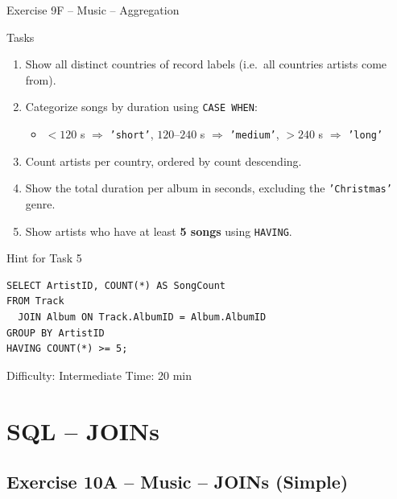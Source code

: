 \documentclass[10pt]{beamer}
\begin{document}
\begin{frame}[fragile]{Exercise 9F -- Music -- Aggregation}
  \begin{block}{Tasks}
    \begin{enumerate}
      \item Show all distinct countries of record labels (i.e.\ all countries artists come from).
      \item Categorize songs by duration using \texttt{CASE WHEN}:
        \begin{itemize}
          \item $< 120$ s $\Rightarrow$ \texttt{'short'}, \quad $120$--$240$ s $\Rightarrow$ \texttt{'medium'}, \quad $> 240$ s $\Rightarrow$ \texttt{'long'}
        \end{itemize}
      \item Count artists per country, ordered by count descending.
      \item Show the total duration per album in seconds, excluding the \texttt{'Christmas'} genre.
      \item Show artists who have at least \textbf{5 songs} using \texttt{HAVING}.
    \end{enumerate}
  \end{block}

  \begin{block}{Hint for Task 5}
\begin{lstlisting}[style=sqlstyle]
SELECT ArtistID, COUNT(*) AS SongCount
FROM Track
  JOIN Album ON Track.AlbumID = Album.AlbumID
GROUP BY ArtistID
HAVING COUNT(*) >= 5;
\end{lstlisting}
  \end{block}

  \begin{alertblock}{Difficulty: Intermediate \quad Time: 20 min}
  \end{alertblock}
\end{frame}

\section{SQL -- JOINs}

\subsection{Exercise 10A -- Music -- JOINs (Simple)}
\end{document}
